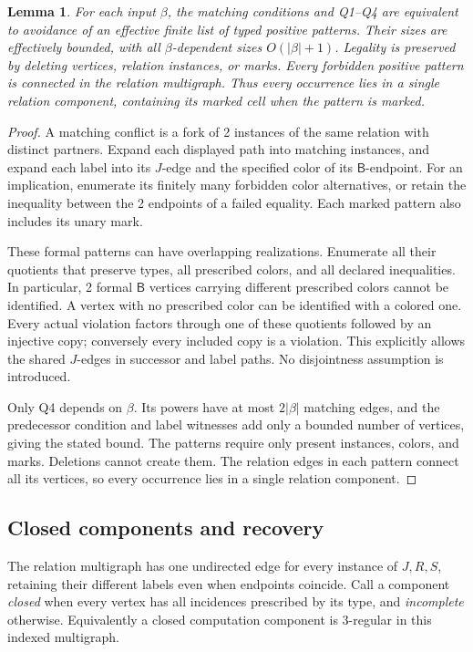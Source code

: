 \documentclass[10pt]{article}
\numberwithin{equation}{section}
\newtheorem{lemma}[lemma]{Lemma}\aliascntresetthe{lemma}
\theoremstyle{definition}
\begin{document}
\begin{lemma}
\label{lem:two-type-positive-obstructions}
For each input $\beta$, the matching conditions and Q1--Q4 are equivalent to avoidance of an effective finite list of typed positive patterns. Their sizes are effectively bounded, with all $\beta$-dependent sizes $O(|\beta|+1)$. Legality is preserved by deleting vertices, relation instances, or marks. Every forbidden positive pattern is connected in the relation multigraph. Thus every occurrence lies in a single relation component, containing its marked cell when the pattern is marked.
\end{lemma}
\begin{proof}
A matching conflict is a fork of 2 instances of the same relation with distinct partners. Expand each displayed path into matching instances, and expand each label into its $J$-edge and the specified color of its $\mathsf B$-endpoint. For an implication, enumerate its finitely many forbidden color alternatives, or retain the inequality between the 2 endpoints of a failed equality. Each marked pattern also includes its unary mark.

These formal patterns can have overlapping realizations. Enumerate all their quotients that preserve types, all prescribed colors, and all declared inequalities. In particular, 2 formal $\mathsf B$ vertices carrying different prescribed colors cannot be identified. A vertex with no prescribed color can be identified with a colored one. Every actual violation factors through one of these quotients followed by an injective copy; conversely every included copy is a violation. This explicitly allows the shared $J$-edges in successor and label paths. No disjointness assumption is introduced.

Only Q4 depends on $\beta$. Its powers have at most $2|\beta|$ matching edges, and the predecessor condition and label witnesses add only a bounded number of vertices, giving the stated bound. The patterns require only present instances, colors, and marks. Deletions cannot create them. The relation edges in each pattern connect all its vertices, so every occurrence lies in a single relation component.
\end{proof}

\subsection{Closed components and recovery}

The relation multigraph has one undirected edge for every instance of $J,R,S$, retaining their different labels even when endpoints coincide. Call a component \emph{closed} when every vertex has all incidences prescribed by its type, and \emph{incomplete} otherwise. Equivalently a closed computation component is 3-regular in this indexed multigraph.
\end{document}
